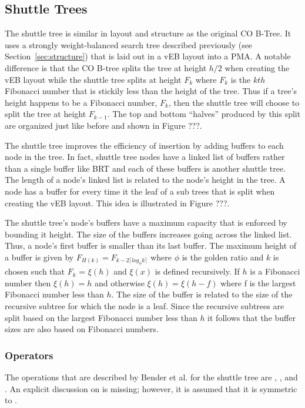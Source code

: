 \documentclass{style}
\begin{document}
\subsection{Shuttle Trees}

The shuttle tree is similar in layout and structure as the original CO B-Tree.
It uses a strongly weight-balanced search tree described previously (see
Section~\ref{sec:structure}) that is laid out in a vEB layout into a PMA. A
notable difference is that the CO B-tree splits the tree at height $h/2$ when
creating the vEB layout while the shuttle tree splits at height $F_k$ where
$F_k$ is the $kth$ Fibonacci number that is stickily less than the height of
the tree. Thus if a tree's height happens to be a Fibonacci number, $F_k$,
then the shuttle tree will choose to split the tree at height $F_{k-1}$. The
top and bottom ``halves'' produced by this split are organized just like
before and shown in Figure ???.

The shuttle tree improves the efficiency of insertion by adding buffers to
each node in the tree. In fact, shuttle tree nodes have a linked list of
buffers rather than a single buffer like BRT and each of these buffers is
another shuttle tree. The length of a node's linked list is related to the
node's height in the tree. A node has a buffer for every time it the leaf of a
sub trees that is split when creating the vEB layout. This idea is illustrated
in Figure ???.

The shuttle tree's node's buffers have a maximum capacity that is enforced by
bounding it height. The size of the buffers increases going across the linked
list. Thus, a node's first buffer is smaller than its last buffer. The maximum
height of a buffer is given by $F_{H(k)} = F_{k-2 \lceil log_{\phi} k \rceil}
$ where $\phi$ is the golden ratio and $k$ is chosen such that $F_k$ =
$\xi(h)$ and $\xi(x)$ is defined recursively. If $h$ is a Fibonacci number
then $\xi(h) = h$ and otherwise $\xi(h) = \xi(h-f)$ where f is the largest
Fibonacci number less than $h$. The size of the buffer is related to the size
of the recursive subtree for which the node is a leaf. Since the recursive
subtrees are split based on the largest Fibonacci number less than $h$ it
follows that the buffer sizes are also based on Fibonacci numbers.

\subsubsection{Operators}

The operations that are described by Bender et al. for the shuttle tree are
\Search, \Insert, and \Scan. An explicit discussion on \Delete is missing;
however, it is assumed that it is symmetric to \Insert.
\end{document}
